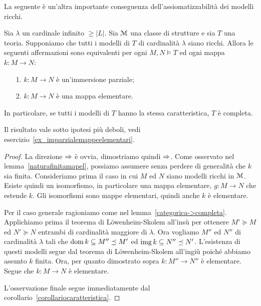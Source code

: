 La seguente \`e un'altra importante conseguenza dell'assiomatizzabilit\`a dei modelli ricchi.

\begin{lemma}\label{imparzialemappeelementari}
Sia $\lambda$ un cardinale infinito $\ge|L|$. Sia $\EuScript M$ una classe di strutture e sia $T$ una teoria.  Supponiamo che tutti i modelli di $T$ di cardinalit\`a $\lambda$ siano ricchi. Allora le seguenti affermazioni sono equivalenti per ogni $M,N\models T$ ed ogni mappa $k:M\to N$:\nobreak
\begin{itemize}
\item[1.] $k:M\to N$ \`e un'immersione parziale;
\item[2.] $k:M\to N$ \`e una mappa elementare.
\end{itemize}
In particolare, se tutti i modelli di $T$ hanno la stessa caratteristica, $T$ \`e completa.
\end{lemma}

Il risultato vale sotto ipotesi pi\`u deboli, vedi esercizio~\ref{ex_imparzialemappeelementari}.



\begin{proof}
La direzione $\Rightarrow$ \`e ovvia, dimostriamo quindi $\Rightarrow$. Come osservato nel lemma~\ref{naturafinitamapel}, possiamo assumere senza perdere di generalit\`a che $k$ sia finita. Consideriamo prima il caso in cui $M$ ed $N$ siano modelli ricchi in $\EuScript M$. Esiste quindi un isomorfismo, in particolare una mappa elementare, $g:M\to N$ che estende $k$. Gli isomorfismi sono mappe elementari, quindi anche $k$ \`e elementare.

Per il caso generale ragioniamo come nel lemma~\ref{categorica->completa}. Applichiamo prima il teorema di L\"owenheim-Skolem all'ins\`u per ottenere $M'\succeq M$ ed $N'\succeq N$ entrambi di cardinalit\`a maggiore di $\lambda$. Ora vogliamo $M''$ ed $N''$ di cardinalit\`a $\lambda$ tali che $\mathop{\rm dom} k\subseteq M''\preceq M'$ ed $\mathop{\rm img} k\subseteq N''\preceq N'$. L'esistenza di questi modelli segue dal teorema di L\"owenheim-Skolem all'ingi\`u poich\'e abbiamo assunto $k$ finita. Ora, per quanto dimostrato sopra $k:M''\to N''$ \`e elementare. Segue che  $k:M\to N$ \`e elementare.

L'osservazione finale segue immediatamente dal corollario~\ref{corollariocaratteristica}.
\end{proof}

